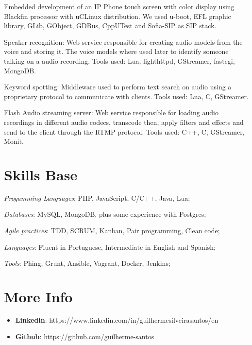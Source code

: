 \documentclass[margin]{res}
\begin{document}
\begin{resume}
Embedded development of an IP Phone touch screen with color display 
using Blackfin processor with uCLinux distribution. We used u-boot, EFL 
graphic library, GLib, GObject, GDBus, CppUTest and Sofia-SIP as SIP stack.

Speaker recognition: Web service responsible for creating audio models from the voice and storing it. The voice models where used later to identify someone talking on a audio recording. Tools used: Lua, lighthttpd, GStreamer, fastcgi, MongoDB.

Keyword spotting: Middleware used to perform text search on audio using a proprietary protocol to communicate with clients. Tools used: Lua, C, GStreamer.

Flash Audio streaming server: Web service responsible for loading audio recordings in different audio codecs, transcode then, apply filters and effects and send to the client through the RTMP protocol. Tools used: C++, C, GStreamer, Monit.

\section{Skills Base} \textit{Progamming Languages}: PHP, JavaScript, C/C++, Java, Lua;

	\textit{Databases}: MySQL, MongoDB, plus some experience with Postgres;

	\textit{Agile practices}: TDD, SCRUM, Kanban, Pair programming, Clean code;

	\textit{Languages}: Fluent in Portuguese, Intermediate in English and Spanish;

	\textit{Tools}: Phing, Grunt, Ansible, Vagrant, Docker, Jenkins;
 
\section{More Info}
    \begin{itemize}
        \item \textbf{Linkedin}: https://www.linkedin.com/in/guilhermesilveirasantos/en
         \item \textbf{Github}: https://github.com/guilherme-santos
    \end{itemize}


\end{resume} 
\end{document}
